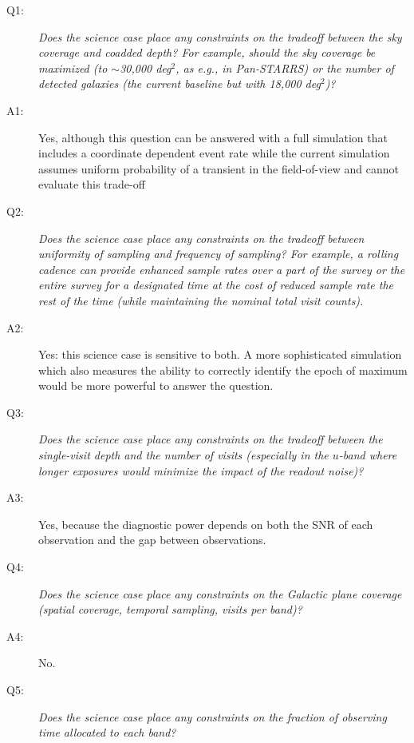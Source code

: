  \begin{description}

 \item[Q1:] {\it Does the science case place any constraints on the
 tradeoff between the sky coverage and coadded depth? For example, should
 the sky coverage be maximized (to $\sim$30,000 deg$^2$, as e.g., in
 Pan-STARRS) or the number of detected galaxies (the current baseline but
 with 18,000 deg$^2$)?}

 \item[A1:] Yes, although this question can be answered with a full simulation that includes a coordinate dependent event rate while the current simulation assumes uniform probability of a transient in the field-of-view and cannot evaluate this trade-off

 \item[Q2:] {\it Does the science case place any constraints on the
 tradeoff between uniformity of sampling and frequency of sampling? For
 example, a rolling cadence can provide enhanced sample rates over a part
 of the survey or the entire survey for a designated time at the cost of
 reduced sample rate the rest of the time (while maintaining the nominal
 total visit counts).}

 \item[A2:] Yes: this science case is sensitive to both. A more sophisticated simulation which also measures the ability to correctly identify the epoch of maximum would be more powerful to answer the question.
   

 \item[Q3:] {\it Does the science case place any constraints on the
 tradeoff between the single-visit depth and the number of visits
 (especially in the $u$-band where longer exposures would minimize the
 impact of the readout noise)?}

 \item[A3:] Yes, because the diagnostic power depends on both the SNR of each observation and the gap between observations. 

 \item[Q4:] {\it Does the science case place any constraints on the
 Galactic plane coverage (spatial coverage, temporal sampling, visits per
 band)?}

 \item[A4:] No.

 \item[Q5:] {\it Does the science case place any constraints on the
 fraction of observing time allocated to each band?}


\end{description}
